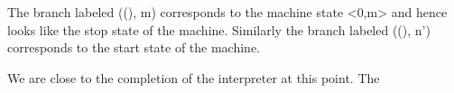 \documentclass{llncs}
\begin{document}




The branch labeled {{((), m)}} corresponds to the machine state
{{<0,m>}} and hence looks like the stop state of the
machine. Similarly the branch labeled {{((), n')}} corresponds to the
start state of the machine.  

We are close to the completion of the interpreter at this point. The
\end{document}
